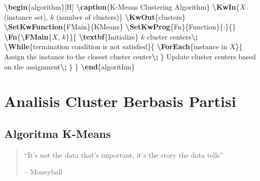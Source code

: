 \documentclass[
  oneside]{book}
\newenvironment{Shaded}{\begin{snugshade}}{\end{snugshade}}
\newcommand{\ExtensionTok}[1]{#1}
\newcommand{\FunctionTok}[1]{\textcolor[rgb]{0.13,0.29,0.53}{\textbf{#1}}}
\newcommand{\KeywordTok}[1]{\textcolor[rgb]{0.13,0.29,0.53}{\textbf{#1}}}
\newcommand{\NormalTok}[1]{#1}
\newcommand{\SpecialStringTok}[1]{\textcolor[rgb]{0.31,0.60,0.02}{#1}}
\begin{document}
\begin{Shaded}
\begin{Highlighting}[]
\KeywordTok{\textbackslash{}begin}\NormalTok{\{}\ExtensionTok{algorithm}\NormalTok{\}[H]}
\FunctionTok{\textbackslash{}caption}\NormalTok{\{K{-}Means Clustering Algorithm\}}
\FunctionTok{\textbackslash{}KwIn}\NormalTok{\{}\SpecialStringTok{$X$}\NormalTok{ (instance set), }\SpecialStringTok{$k$}\NormalTok{ (number of clusters)\}}
\FunctionTok{\textbackslash{}KwOut}\NormalTok{\{clusters\}}
\FunctionTok{\textbackslash{}SetKwFunction}\NormalTok{\{FMain\}\{KMeans\}}
\FunctionTok{\textbackslash{}SetKwProg}\NormalTok{\{Fn\}\{Function\}\{:\}\{\}}
\FunctionTok{\textbackslash{}Fn}\NormalTok{\{}\FunctionTok{\textbackslash{}FMain}\NormalTok{\{}\SpecialStringTok{$X$}\NormalTok{, }\SpecialStringTok{$k$}\NormalTok{\}\}\{}
    \FunctionTok{\textbackslash{}textbf}\NormalTok{\{Initialize\} }\SpecialStringTok{$k$}\NormalTok{ cluster centers}\FunctionTok{\textbackslash{};}
    \FunctionTok{\textbackslash{}While}\NormalTok{\{termination condition is not satisfied\}\{}
        \FunctionTok{\textbackslash{}ForEach}\NormalTok{\{instance in }\SpecialStringTok{$X$}\NormalTok{\}\{}
\NormalTok{            Assign the instance to the closest cluster center}\FunctionTok{\textbackslash{};}
\NormalTok{        \}}
\NormalTok{        Update cluster centers based on the assignment}\FunctionTok{\textbackslash{};}
\NormalTok{    \}}
\NormalTok{\}}
\KeywordTok{\textbackslash{}end}\NormalTok{\{}\ExtensionTok{algorithm}\NormalTok{\}}
\end{Highlighting}
\end{Shaded}

\part{Analisis Cluster Berbasis Partisi}\label{part-analisis-cluster-berbasis-partisi}

\chapter{Algoritma K-Means}\label{km}

\begin{quote}
``It's not the data that's important, it's the story the data tells''

-- Moneyball
\end{quote}
\end{document}
